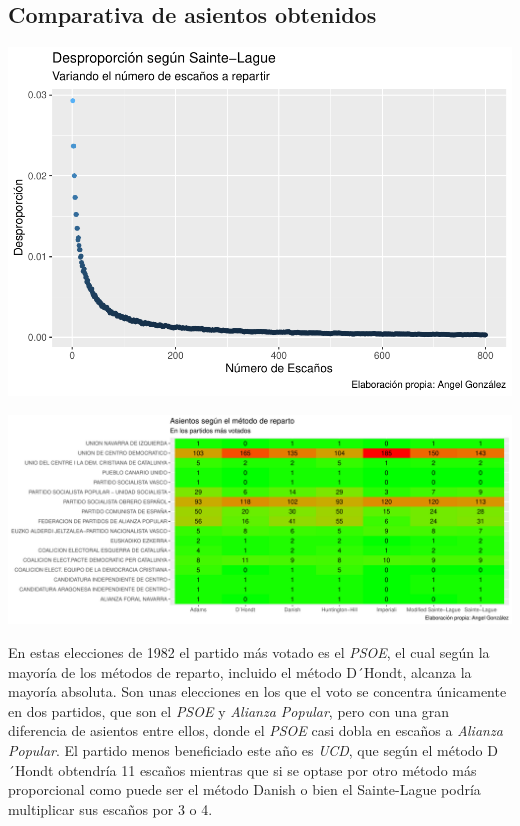 \documentclass[12pt,a4paper,]{book}
\numberwithin{dummy}{section}
\theoremstyle{ocrenumbox}
\theoremstyle{blacknumex}
\theoremstyle{blacknumbox}
\theoremstyle{ocrenum}
\theoremstyle{ocrenum}
\begin{document}
\hypertarget{comparativa-de-asientos-obtenidos-2}{%
\subsection{Comparativa de asientos
obtenidos}\label{comparativa-de-asientos-obtenidos-2}}

\begin{center}\includegraphics[width=1\linewidth]{figurasR/unnamed-chunk-11-1} \end{center}

\begin{center}\includegraphics[width=1\linewidth]{figurasR/unnamed-chunk-11-2} \end{center}

En estas elecciones de 1982 el partido más votado es el \emph{PSOE}, el
cual según la mayoría de los métodos de reparto, incluido el método
D´Hondt, alcanza la mayoría absoluta. Son unas elecciones en los que el
voto se concentra únicamente en dos partidos, que son el \emph{PSOE} y
\emph{Alianza Popular}, pero con una gran diferencia de asientos entre
ellos, donde el \emph{PSOE} casi dobla en escaños a \emph{Alianza
Popular}. El partido menos beneficiado este año es \emph{UCD}, que según
el método D´Hondt obtendría 11 escaños mientras que si se optase por
otro método más proporcional como puede ser el método Danish o bien el
Sainte-Lague podría multiplicar sus escaños por 3 o 4.
\end{document}
